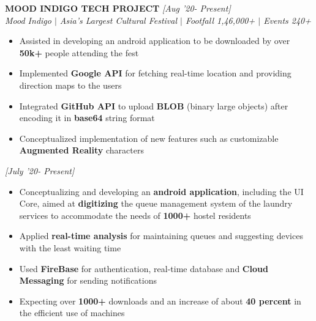 \documentclass[10pt]{article}
\begin{document}
\noindent \textbf{\hspace{-2pt} MOOD INDIGO TECH PROJECT} \hfill{\sl \small [Aug '20- Present]}\\
{\it  Mood Indigo $|$ Asia's Largest Cultural Festival $|$ Footfall 1,46,000+ $|$ Events 240+} \hfill{\sl \small }\\
\vspace{-17pt}
\begin{itemize}[itemsep = -0.75mm]
   \item Assisted in  developing an android application to be downloaded by over \textbf{50k+} people attending the fest
   \item Implemented \textbf{Google API} for fetching real-time location and providing direction maps to the users
   \item Integrated \textbf{GitHub API} to upload \textbf{BLOB} (binary large objects) after encoding it in \textbf{base64} string format
   \item Conceptualized implementation of new features such as customizable \textbf{Augmented Reality} characters
\end{itemize}
\hfill{\sl \small [July '20- Present]}
\vspace{-6pt}
\begin{itemize}[itemsep = -0.75mm]
   \item{Conceptualizing and developing an \textbf{android application}, including the UI Core, aimed  at \textbf{digitizing} the queue management system of the laundry services to accommodate the needs of \textbf{1000+} hostel residents  }
   \item Applied \textbf{real-time analysis} for maintaining  queues and suggesting devices with the least waiting time
   \item Used \textbf{FireBase} for authentication, real-time database and \textbf{Cloud Messaging} for sending notifications
   \item{Expecting over \textbf{1000+} downloads and an increase of about \textbf{40 percent} in the efficient use of machines}
\end{itemize}
\hspace{-7pt}
\vspace{-10pt}
\end{document}
